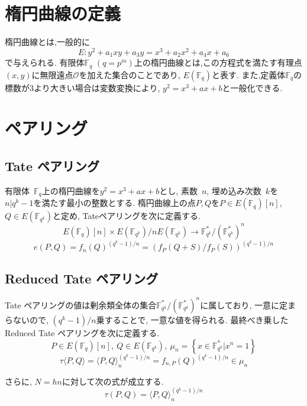 \documentclass[twocolumn]{jsarticle} %
\begin{document}
\section{楕円曲線の定義}
楕円曲線とは,一般的に
\vspace{-2mm}
\[E:y^2+a_1xy+a_3y=x^3+a_2x^2+a_4x+a_6\]
で与えられる. 有限体$\mathbb {F}_q$ $(q=p^m)$上の楕円曲線とは,この方程式を満たす有理点$(x,y)$に無限遠点$\mathcal{O}$を加えた集合のことであり, $E(\mathbb {F}_q)$と表す. また,定義体$\mathbb {F}_q$の標数が3より大きい場合は変数変換により, $y^2=x^3+ax+b$と一般化できる.
\section{ペアリング}
\subsection{Tate ペアリング}
有限体\ $\mathbb{F}_q$上の楕円曲線を$y^2=x^3+ax+b$とし, 素数\ $n$, 埋め込み次数\ $k$を$n|q^k-1$を満たす最小の整数とする. 楕円曲線上の点$P,Q$を$P\in E(\mathbb{F}_q)[n]$,\ $Q\in E(\mathbb{F}_{q^k})$と定め, Tateペアリングを次に定義する.
\vspace{-2mm}
\[E(\mathbb{F}_q)[n]\times E(\mathbb{F}_{q^k})/nE(\mathbb{F}_{q^k})\rightarrow \mathbb{F}_{q^k}^{*}/(\mathbb{F}_{q^k}^{*})^n\]
\vspace{-8mm}
\[e(P,Q)=f_{n}(Q)^{{(q^k-1)/n}}=(f_P(Q+S)/f_P(S))^{(q^k-1)/n}\]
\subsection{Reduced Tate ペアリング}
Tate ペアリングの値は剰余類全体の集合$\mathbb{F}_{q^k}^\ast/(\mathbb{F}_{q^k}^\ast)^n$に属しており, 一意に定まらないので, $(q^k - 1) / n$乗することで, 一意な値を得られる. 最終べき乗したReduced Tate ペアリングを次に定義する.
\vspace{-2mm}
\[P \in E(\mathbb{F}_q)[n],\ Q \in E(\mathbb{F}_{q^k}),\ \mu_n = \left\{ x \in \mathbb{F}_{q^k}^\ast | x^n = 1 \right\}\]
\vspace{-4mm}
\[\tau \langle P,Q \rangle = \langle P,Q \rangle _n^{(q^k - 1) / n} = f_{n,P}(Q)^{(q^k - 1) / n} \in \mu_n\]
\par
\vspace{-2mm}
さらに, $N = hn$に対して次の式が成立する.
\vspace{-2mm}
\[
\tau(P,Q) = \langle P,Q \rangle _n^{(q^k - 1) / n}
\]
\vspace{-7mm}
\end{document}
